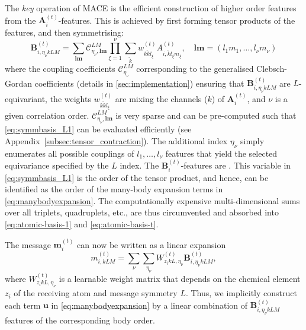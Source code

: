 \documentclass{article}
\def\kk{k}
\begin{document}
The \textit{key} operation of MACE is the efficient construction of higher order features from the $\bm{A}_{i}^{(t)}$-features.
This is achieved by first forming tensor products of the features, and then symmetrising:
%
\begin{equation} \label{eq:symmbasis_L1}
  {\bm B}^{(t)}_{i,\eta_{\nu} \kk LM}
  = \sum_{{\bm l}{\bm m}} \mathcal{C}^{LM}_{\eta_{\nu}, \bm l \bm m} \prod_{\xi = 1}^{\nu} \sum_{\tilde{\kk}} w_{\kk \tilde{\kk} l_{\xi}}^{(t)}A_{i,\tilde{\kk} l_\xi  m_\xi}^{(t)}, \quad {\bm l}{\bm m} = (l_{1}m_{1},\dots,l_{\nu}m_{\nu})
\end{equation}
%
where the coupling coefficients $\mathcal{C}^{LM}_{\eta_{\nu}}$ corresponding to the generalised Clebsch-Gordan coefficients (details in \ref{sec:implementation}) ensuring that ${\bm B}^{(t)}_{i,\eta_{\nu} \kk LM}$ are $L$-equivariant,
the weights $w_{\kk \tilde{\kk} l_{\xi}}^{(t)}$ are mixing the channels ($k$) of $\bm{A}_{i}^{(t)}$,
and $\nu$ is a given correlation order.
$\mathcal{C}^{LM}_{\eta_{\nu}, \bm l \bm m}$ is very sparse and can be pre-computed such that \eqref{eq:symmbasis_L1} can be evaluated efficiently (see Appendix~\ref{subsec:tensor_contraction}).
The additional index $\eta_{\nu}$ simply enumerates all possible couplings of $l_1, \dots, l_{\nu}$ features that yield the selected equivariance specified by the $L$ index. The ${\bm B}^{(t)}_{i}$-features are \color{red}{
constructed up to some maximum $\nu$} \color{black}. This variable in \eqref{eq:symmbasis_L1} is the order of the tensor product, and hence, can be identified as the order of the many-body expansion terms in \eqref{eq:manybodyexpansion}.
The computationally expensive multi-dimensional sums over all triplets, quadruplets, etc., are thus circumvented and absorbed into \eqref{eq:atomic-basis-1} and \eqref{eq:atomic-basis-t}.

The message $\bm m_i^{(t)}$ can now be written as a linear expansion
%
\begin{equation}
  \label{eq:message}
  m_{i,\kk LM}^{(t)} =  \sum_{\nu} \sum_{\eta_{\nu}} W_{z_{i}\kk L, \eta_{\nu}}^{(t)} {\bm B}^{(t)}_{i,\eta_{\nu} \kk LM},
\end{equation}
%
where $W_{z_{i}\kk L, \eta_{\nu}}^{(t)}$ is a learnable weight matrix that depends on the chemical element $z_i$ of the receiving atom and message symmetry $L$.
Thus, we implicitly construct each term ${\bm u}$ in \eqref{eq:manybodyexpansion} by a linear combination of ${\bm B}^{(t)}_{i,\eta_{\nu} \kk LM}$ features of the corresponding body order. 
\end{document}
